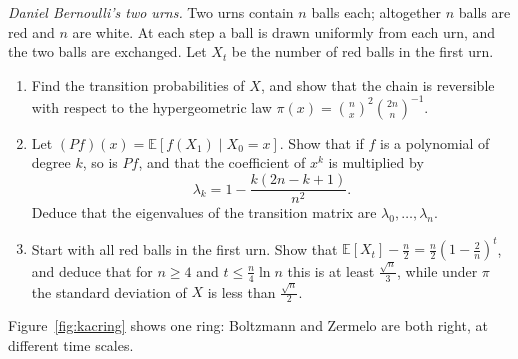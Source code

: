 \begin{exercise}[$\star\star\star$]\label{pb:bernoullilaplace}
\emph{Daniel Bernoulli's two urns.} Two urns contain $n$ balls each; altogether $n$ balls are red and $n$ are white. At each step a ball is
drawn uniformly from each urn, and the two balls are exchanged. Let $X_t$ be the number of red balls in the first urn.
\begin{enumerate}[label=(\alph*)]
\item Find the transition probabilities of $X$, and show that the chain is reversible with respect to the hypergeometric law
$\pi(x)=\binom nx^2\binom{2n}n^{-1}$.
\item Let $(Pf)(x)=\mathbb E[f(X_1)\mid X_0=x]$. Show that if $f$ is a polynomial of degree $k$, so is $Pf$, and that the coefficient of $x^k$ is multiplied by
\[
\lambda_k=1-\frac{k(2n-k+1)}{n^2}.
\]
Deduce that the eigenvalues of the transition matrix are $\lambda_0,\dots,\lambda_n$.
\item Start with all red balls in the first urn. Show that $\mathbb E[X_t]-\frac n2=\frac n2(1-\frac2n)^t$, and deduce that for $n\ge4$ and $t\le\frac n4\ln n$ this is at least
$\frac{\sqrt n}3$, while under $\pi$ the standard deviation of $X$ is less than $\frac{\sqrt n}2$.
\end{enumerate}
\end{exercise}

Figure~\ref{fig:kacring} shows one ring: Boltzmann and Zermelo are both right, at different time scales.

